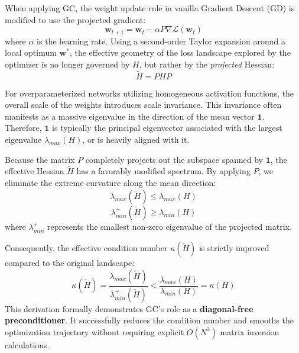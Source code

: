\documentclass[conference]{IEEEtran}
\begin{document}
When applying GC, the weight update rule in vanilla Gradient Descent (GD) is modified to use the projected gradient:
\begin{equation}
\mathbf{w}_{t+1} = \mathbf{w}_t - \alpha P \nabla \mathcal{L}(\mathbf{w}_t)
\end{equation}
where $\alpha$ is the learning rate. Using a second-order Taylor expansion around a local optimum $\mathbf{w}^*$, the effective geometry of the loss landscape explored by the optimizer is no longer governed by $H$, but rather by the \textit{projected} Hessian:
\begin{equation}
\tilde{H} = P H P
\end{equation}

For overparameterized networks utilizing homogeneous activation functions, the overall scale of the weights introduces scale invariance. This invariance often manifests as a massive eigenvalue in the direction of the mean vector $\mathbf{1}$. Therefore, $\mathbf{1}$ is typically the principal eigenvector associated with the largest eigenvalue $\lambda_{max}(H)$, or is heavily aligned with it.

Because the matrix $P$ completely projects out the subspace spanned by $\mathbf{1}$, the effective Hessian $\tilde{H}$ has a favorably modified spectrum. By applying $P$, we eliminate the extreme curvature along the mean direction:
\begin{equation}
\lambda_{max}(\tilde{H}) \le \lambda_{max}(H)
\end{equation}
\begin{equation}
\lambda_{min}^+(\tilde{H}) \ge \lambda_{min}(H)
\end{equation}
where $\lambda_{min}^+$ represents the smallest non-zero eigenvalue of the projected matrix. 

Consequently, the effective condition number $\kappa(\tilde{H})$ is strictly improved compared to the original landscape:
\begin{equation}
\kappa(\tilde{H}) = \frac{\lambda_{max}(\tilde{H})}{\lambda_{min}^+(\tilde{H})} < \frac{\lambda_{max}(H)}{\lambda_{min}(H)} = \kappa(H)
\end{equation}
This derivation formally demonstrates GC's role as a \textbf{diagonal-free preconditioner}. It successfully reduces the condition number and smooths the optimization trajectory without requiring explicit $O(N^3)$ matrix inversion calculations.
\end{document}
